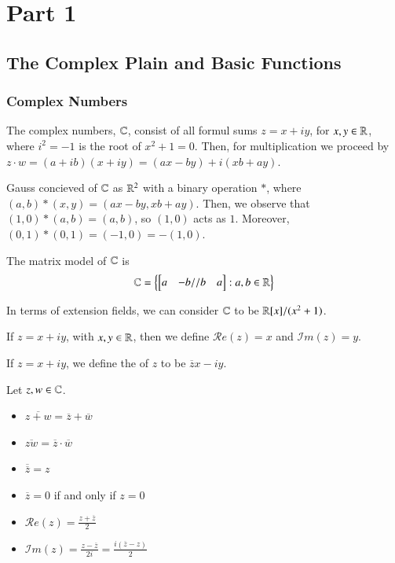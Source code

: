 \documentclass[12pt, a4paper, oneside, openright, titlepage]{book}
\begin{document}
\tableofcontents


\part{Part 1}

\chapter{The Complex Plain and Basic Functions}




\section{Complex Numbers}

The complex numbers, $\mathbb C$, consist of all formul sums $z = x+iy$, for $x,y \in \mathbb R$, where $i^2 = -1$ is the root of $x^2 + 1 = 0$. Then, for multiplication we proceed by $z\cdot w = (a+ib)(x+iy) = (ax-by)+i(xb+ay)$.

Gauss concieved of $\mathbb C$ as $\mathbb R^2$ with a binary operation $*$, where $(a,b)*(x,y) = (ax-by,xb+ay)$. Then, we observe that $(1,0)*(a,b) = (a,b)$, so $(1,0)$ acts as $1$. Moreover, $(0,1)*(0,1) = (-1,0) = -(1,0)$. 


The matrix model of $\mathbb C$ is $$\mathbb C = \left\{\begin{bmatrix} a & -b // b & a \end{bmatrix}: a,b \in \mathbb R\right\}$$

In terms of extension fields, we can consider $\mathbb C$ to be $\mathbb R[x]/(x^2+1)$. 

\begin{defn}
    If $z = x+iy$, with $x,y \in \mathbb R$, then we define $\mathscr{R}e(z) = x$ and $\mathscr{I}m(z) = y$.
\end{defn}


\begin{defn}
    If $z = x+iy$, we define the  of $z$ to be $\overline{z} x-iy$.
\end{defn}

\begin{props}
    Let $z,w \in \mathbb C$. \begin{itemize}
        \item $\overline{z+w} = \overline{z}+\overline{w}$
        \item $\overline{zw} = \overline{z}\cdot \overline{w}$
        \item $\overline{\overline{z}} = z$
        \item $\overline{z} = 0$ if and only if $z = 0$
        \item $\mathscr{R}e(z) = \frac{z+\overline{z}}{2}$
        \item $\mathscr{I}m(z) = \frac{z-\overline{z}}{2i} = \frac{i(\overline{z}-z)}{2}$
    \end{itemize}
\end{props}
\end{document}
